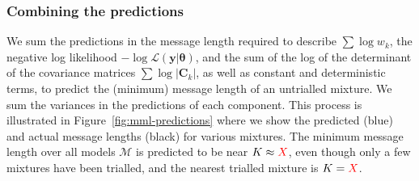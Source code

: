 \documentclass{elsarticle}
\newcommand{\todo}[1]{\textcolor{red}{#1}}
\newcommand{\vect}[1]{\boldsymbol{\mathbf{#1}}}
\renewcommand{\vec}[1]{\vect{#1}}
\def\cov{C}
\def\veccov{\vect{\cov}}
\def\vectheta{\vect{\theta}}
\def\weight{w}
\def\datum{y}
\def\data{\vect{\datum}}
\begin{document}
\subsubsection{Combining the predictions}

We sum the predictions in the message length required to describe $\sum\log\weight_k$, the
negative log likelihood $-\log{\mathcal{L}(\data|\vectheta)}$, and the sum of the log of 
the determinant of the covariance matrices $\sum\log|\veccov_k|$, as well as constant and
deterministic terms, to predict the (minimum) message length of an untrialled mixture.
We sum the variances in the predictions of each component. This process is illustrated in
Figure~\ref{fig:mml-predictions} where we show the predicted (blue) and actual message lengths 
(black) for various mixtures. The
minimum message length over all models $\vec{\mathcal{M}}$ is predicted to be near
$K \approx \todo{X}$, even though only a few mixtures have been trialled, and the nearest
trialled mixture is $K = \todo{X}$. 
\end{document}
